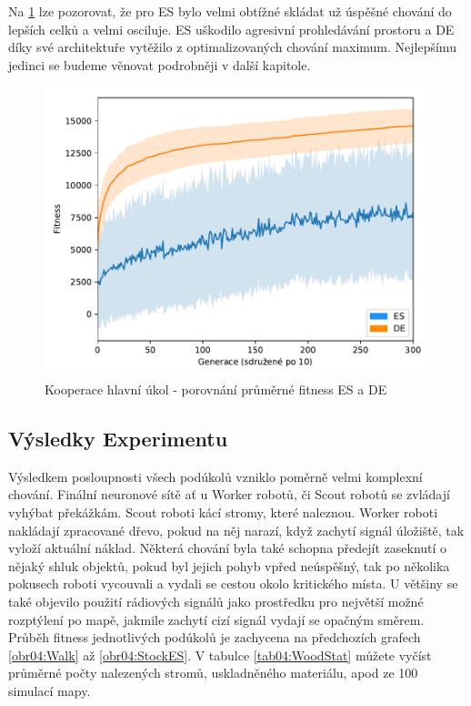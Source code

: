 	Na \ref{obr04:CoopESvsDE} lze pozorovat, že pro ES bylo velmi obtížné skládat už úspěšné chování do lepších celků a velmi osciluje. ES uškodilo agresivní prohledávání prostoru a DE díky své architektuře vytěžilo z optimalizovaných chování maximum. Nejlepšímu jedinci se budeme věnovat podrobněji v další kapitole. 
		\clearpage
		\begin{figure}[t]\centering
		\includegraphics[width=\columnwidth]{../img/WoodMap/DEvsES/WoodCoopMem}
		\caption{Kooperace  hlavní úkol  - porovnání průměrné fitness ES a DE}
		\label{obr04:CoopESvsDE}
	\end{figure}
	\clearpage
	
	\subsection{Výsledky Experimentu}
	Výsledkem posloupnosti všech podúkolů vzniklo poměrně velmi komplexní chování. Finální neuronové sítě ať u Worker robotů, či Scout robotů se zvládají vyhýbat překážkám. Scout roboti kácí stromy, které naleznou. Worker roboti nakládají zpracované dřevo, pokud na něj narazí, když zachytí signál úložiště, tak vyloží aktuální náklad. Některá chování byla také schopna předejít zaseknutí o nějaký shluk objektů, pokud byl  jejich pohyb vpřed neúspěšný, tak po několika pokusech roboti vycouvali a vydali se cestou okolo kritického místa. U většiny se také objevilo použití rádiových signálů jako prostředku pro největší možné rozptýlení po mapě, jakmile zachytí cizí signál vydají se opačným směrem. Průběh fitness jednotlivých podúkolů je zachycena na předchozích grafech \ref{obr04:Walk} až \ref{obr04:StockES}. V tabulce \ref{tab04:WoodStat} můžete vyčíst průměrné počty nalezených stromů, uskladněného materiálu, apod ze 100 simulací mapy. 
	
